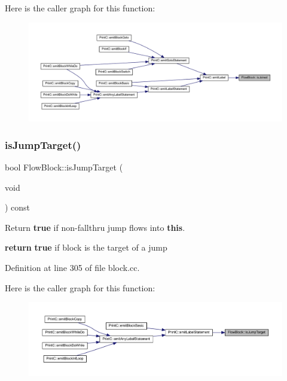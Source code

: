 Here is the caller graph for this function\+:
\nopagebreak
\begin{figure}[H]
\begin{center}
\leavevmode
\includegraphics[width=350pt]{class_flow_block_a45bcc5e1fc638ad05984b64d874e8859_icgraph}
\end{center}
\end{figure}
\mbox{\label{class_flow_block_a9dd26ef25c281fc1c64a99ecd1c9eada}} 
\subsubsection{\texorpdfstring{isJumpTarget()}{isJumpTarget()}}
{\footnotesize\ttfamily bool Flow\+Block\+::is\+Jump\+Target (\begin{DoxyParamCaption}\item[{void}]{ }\end{DoxyParamCaption}) const}



Return {\bfseries{true}} if non-\/fallthru jump flows into {\bfseries{this}}. 

{\bfseries{return}} {\bfseries{true}} if block is the target of a jump 

Definition at line 305 of file block.\+cc.

Here is the caller graph for this function\+:
\nopagebreak
\begin{figure}[H]
\begin{center}
\leavevmode
\includegraphics[width=350pt]{class_flow_block_a9dd26ef25c281fc1c64a99ecd1c9eada_icgraph}
\end{center}
\end{figure}
\mbox{\label{class_flow_block_afe445faa27ff80aab7f9830068da9d39}} 
